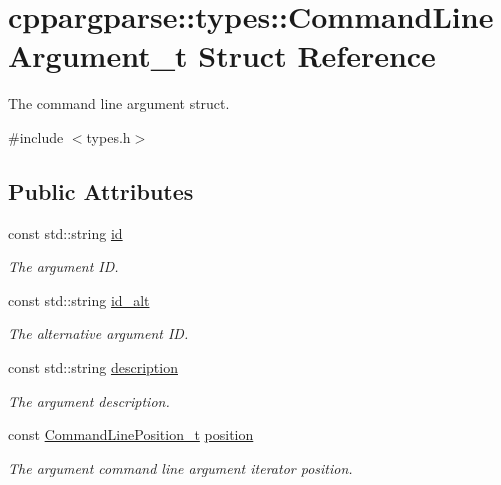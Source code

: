 \hypertarget{structcppargparse_1_1types_1_1CommandLineArgument__t}{}\section{cppargparse\+:\+:types\+:\+:Command\+Line\+Argument\+\_\+t Struct Reference}
\label{structcppargparse_1_1types_1_1CommandLineArgument__t}


The command line argument struct.  




{\ttfamily \#include $<$types.\+h$>$}

\subsection*{Public Attributes}
\begin{DoxyCompactItemize}
\item 
const std\+::string \hyperlink{structcppargparse_1_1types_1_1CommandLineArgument__t_afbbbb28758ea93a22d7bc9520acb9205}{id}
\begin{DoxyCompactList}\small\item\em The argument ID. \end{DoxyCompactList}\item 
const std\+::string \hyperlink{structcppargparse_1_1types_1_1CommandLineArgument__t_a7fd5fda4e06af1ad54daa0951ca8ff02}{id\+\_\+alt}
\begin{DoxyCompactList}\small\item\em The alternative argument ID. \end{DoxyCompactList}\item 
const std\+::string \hyperlink{structcppargparse_1_1types_1_1CommandLineArgument__t_a2c001819f7a00e3b42277ace1a2f697b}{description}
\begin{DoxyCompactList}\small\item\em The argument description. \end{DoxyCompactList}\item 
const \hyperlink{types_8h_a43b4f43f8940de1bf09ced6f1b668053}{Command\+Line\+Position\+\_\+t} \hyperlink{structcppargparse_1_1types_1_1CommandLineArgument__t_a942c3909aa9951e8e06fa2b3aaa77054}{position}
\begin{DoxyCompactList}\small\item\em The argument command line argument iterator position. \end{DoxyCompactList}\end{DoxyCompactItemize}


